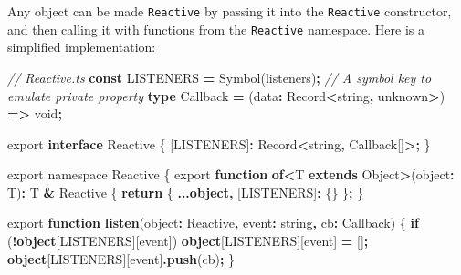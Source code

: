 \documentclass[
]{book}
\newenvironment{Shaded}{\begin{snugshade}}{\end{snugshade}}
\newcommand{\BuiltInTok}[1]{#1}
\newcommand{\CommentTok}[1]{\textcolor[rgb]{0.56,0.35,0.01}{\textit{#1}}}
\newcommand{\ControlFlowTok}[1]{\textcolor[rgb]{0.13,0.29,0.53}{\textbf{#1}}}
\newcommand{\DataTypeTok}[1]{\textcolor[rgb]{0.13,0.29,0.53}{#1}}
\newcommand{\FunctionTok}[1]{\textcolor[rgb]{0.13,0.29,0.53}{\textbf{#1}}}
\newcommand{\ImportTok}[1]{#1}
\newcommand{\KeywordTok}[1]{\textcolor[rgb]{0.13,0.29,0.53}{\textbf{#1}}}
\newcommand{\NormalTok}[1]{#1}
\newcommand{\OperatorTok}[1]{\textcolor[rgb]{0.81,0.36,0.00}{\textbf{#1}}}
\newcommand{\VerbatimStringTok}[1]{\textcolor[rgb]{0.31,0.60,0.02}{#1}}
\theoremstyle{definition}
\theoremstyle{definition}
\theoremstyle{definition}
\theoremstyle{definition}
\theoremstyle{remark}
\begin{document}
Any object can be made \texttt{Reactive} by passing it into the \texttt{Reactive} constructor, and then calling it with functions from the \texttt{Reactive} namespace. Here is a simplified implementation:

\begin{Shaded}
\begin{Highlighting}[]
\CommentTok{// Reactive.ts}
\KeywordTok{const}\NormalTok{ LISTENERS }\OperatorTok{=} \BuiltInTok{Symbol}\NormalTok{(}\VerbatimStringTok{\textasciigrave{}listeners\textasciigrave{}}\NormalTok{)}\OperatorTok{;} \CommentTok{// A symbol key to emulate private property}
\KeywordTok{type}\NormalTok{ Callback }\OperatorTok{=}\NormalTok{ (data}\OperatorTok{:} \BuiltInTok{Record}\OperatorTok{\textless{}}\DataTypeTok{string}\OperatorTok{,} \DataTypeTok{unknown}\OperatorTok{\textgreater{}}\NormalTok{) }\KeywordTok{=\textgreater{}} \DataTypeTok{void}\OperatorTok{;}

\ImportTok{export} \KeywordTok{interface}\NormalTok{ Reactive \{}
\NormalTok{  [LISTENERS]}\OperatorTok{:} \BuiltInTok{Record}\OperatorTok{\textless{}}\DataTypeTok{string}\OperatorTok{,}\NormalTok{ Callback[]}\OperatorTok{\textgreater{};}
\NormalTok{\}}

\ImportTok{export} \ImportTok{namespace} \DataTypeTok{Reactive}\NormalTok{ \{}
  \ImportTok{export} \KeywordTok{function} \KeywordTok{of}\OperatorTok{\textless{}}\NormalTok{T }\KeywordTok{extends} \BuiltInTok{Object}\OperatorTok{\textgreater{}}\NormalTok{(object}\OperatorTok{:}\NormalTok{ T)}\OperatorTok{:}\NormalTok{ T }\OperatorTok{\&}\NormalTok{ Reactive \{}
    \ControlFlowTok{return}\NormalTok{ \{ }\OperatorTok{...}\KeywordTok{object}\OperatorTok{,}\NormalTok{ [LISTENERS]}\OperatorTok{:}\NormalTok{ \{\} \}}\OperatorTok{;}
\NormalTok{  \}}

  \ImportTok{export} \KeywordTok{function} \FunctionTok{listen}\NormalTok{(object}\OperatorTok{:}\NormalTok{ Reactive}\OperatorTok{,}\NormalTok{ event}\OperatorTok{:} \DataTypeTok{string}\OperatorTok{,}\NormalTok{ cb}\OperatorTok{:}\NormalTok{ Callback) \{}
    \ControlFlowTok{if}\NormalTok{ (}\OperatorTok{!}\KeywordTok{object}\NormalTok{[LISTENERS][}\BuiltInTok{event}\NormalTok{]) }\KeywordTok{object}\NormalTok{[LISTENERS][}\BuiltInTok{event}\NormalTok{] }\OperatorTok{=}\NormalTok{ []}\OperatorTok{;}
    \KeywordTok{object}\NormalTok{[LISTENERS][}\BuiltInTok{event}\NormalTok{]}\OperatorTok{.}\FunctionTok{push}\NormalTok{(cb)}\OperatorTok{;}
\NormalTok{  \}}


\end{Highlighting}
\end{Shaded}
\end{document}
